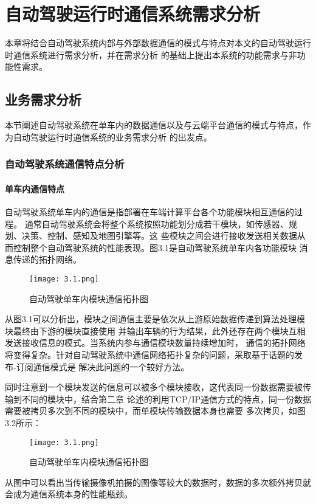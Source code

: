 \chapter{自动驾驶运行时通信系统需求分析}
本章将结合自动驾驶系统内部与外部数据通信的模式与特点对本文的自动驾驶运行时通信系统进行需求分析，并在需求分析
的基础上提出本系统的功能需求与非功能性需求。
\section{业务需求分析}
本节阐述自动驾驶系统在单车内的数据通信以及与云端平台通信的模式与特点，作为自动驾驶运行时通信系统的业务需求分析
的出发点。
\subsection{自动驾驶系统通信特点分析}
\subsubsection{单车内通信特点}
自动驾驶系统单车内的通信是指部署在车端计算平台各个功能模块相互通信的过程。
通常自动驾驶系统会将整个系统按照功能划分成若干模块，如传感器、规划、决策、控制、感知及地图引擎等。这
些模块之间会进行接收发送相关数据从而控制整个自动驾驶系统的性能表现。图3.1是自动驾驶系统单车内各功能模块
消息传递的拓扑网络。
\begin{figure}[H]
  \centering
  \texttt{[image: 3.1.png]}
  \caption{自动驾驶单车内模块通信拓扑图}
  \label{fig:13}
\end{figure}
从图3.1可以分析出，模块之间通信主要是依次从上游原始数据传递到算法处理模块最终由下游的模块直接使用
并输出车辆的行为结果，此外还存在两个模块互相发送接收信息的模式。当系统内参与通信模块数量持续增加时，
通信的拓扑网络将变得复杂。针对自动驾驶系统中通信网络拓扑复杂的问题，采取基于话题的发布-订阅通信模式是
解决此问题的一个较好方法。

同时注意到一个模块发送的信息可以被多个模块接收，这代表同一份数据需要被传输到不同的模块中，结合第二章
论述的利用TCP/IP通信方式的特点，同一份数据需要被拷贝多次到不同的模块中，而单模块传输数据本身也需要
多次拷贝，如图3.2所示：
\begin{figure}[H]
  \centering
  \texttt{[image: 3.1.png]}
  \caption{自动驾驶单车内模块通信拓扑图}
  \label{fig:14}
\end{figure}
从图中可以看出当传输摄像机拍摄的图像等较大的数据时，数据的多次额外拷贝就会成为通信系统本身的性能瓶颈。
